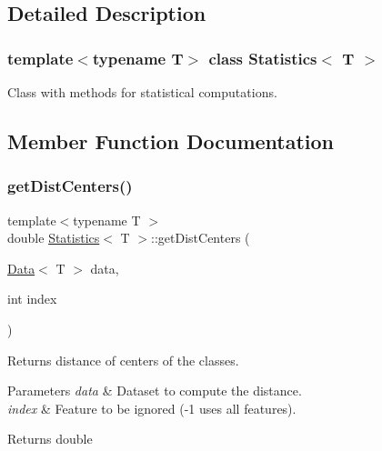 \subsection{Detailed Description}
\subsubsection*{template$<$typename T$>$\newline
class Statistics$<$ T $>$}

Class with methods for statistical computations. 

\subsection{Member Function Documentation}
\mbox{\label{class_statistics_ac7673aaf51acf57cfc240cb213f4b30f}} 
\subsubsection{\texorpdfstring{get\+Dist\+Centers()}{getDistCenters()}}
{\footnotesize\ttfamily template$<$typename T $>$ \\
double \mbox{\hyperlink{class_statistics}{Statistics}}$<$ T $>$\+::get\+Dist\+Centers (\begin{DoxyParamCaption}\item[{\mbox{\hyperlink{class_data}{Data}}$<$ T $>$}]{data,  }\item[{int}]{index }\end{DoxyParamCaption})\hspace{0.3cm}{\ttfamily [static]}}



Returns distance of centers of the classes. 


\begin{DoxyParams}{Parameters}
{\em data} & Dataset to compute the distance. \\
\hline
{\em index} & Feature to be ignored (-\/1 uses all features). \\
\hline
\end{DoxyParams}
\begin{DoxyReturn}{Returns}
double 
\end{DoxyReturn}
\mbox{\label{class_statistics_a781ebfca723e5c57db495635225363e6}} 
